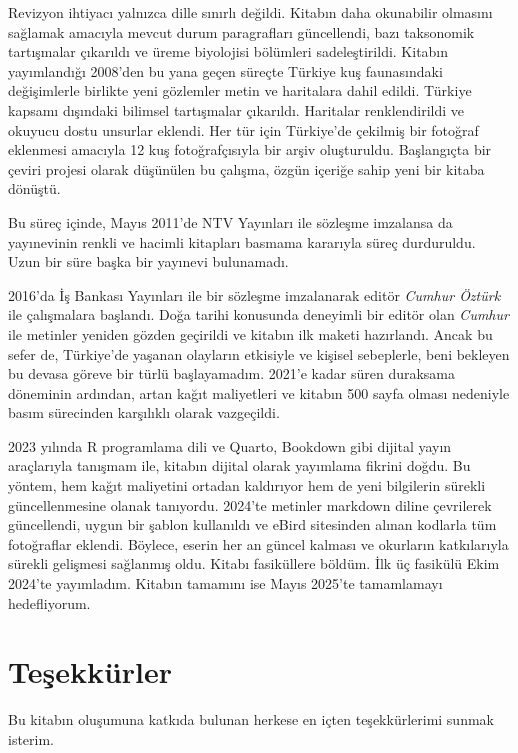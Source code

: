 \documentclass[
  a4paper,
  DIV=11,
  numbers=noendperiod]{scrreprt}
\begin{document}
Revizyon ihtiyacı yalnızca dille sınırlı değildi. Kitabın daha
okunabilir olmasını sağlamak amacıyla mevcut durum paragrafları
güncellendi, bazı taksonomik tartışmalar çıkarıldı ve üreme biyolojisi
bölümleri sadeleştirildi. Kitabın yayımlandığı 2008'den bu yana geçen
süreçte Türkiye kuş faunasındaki değişimlerle birlikte yeni gözlemler
metin ve haritalara dahil edildi. Türkiye kapsamı dışındaki bilimsel
tartışmalar çıkarıldı. Haritalar renklendirildi ve okuyucu dostu
unsurlar eklendi. Her tür için Türkiye'de çekilmiş bir fotoğraf
eklenmesi amacıyla 12 kuş fotoğrafçısıyla bir arşiv oluşturuldu.
Başlangıçta bir çeviri projesi olarak düşünülen bu çalışma, özgün
içeriğe sahip yeni bir kitaba dönüştü.

Bu süreç içinde, Mayıs 2011'de NTV Yayınları ile sözleşme imzalansa da
yayınevinin renkli ve hacimli kitapları basmama kararıyla süreç
durduruldu. Uzun bir süre başka bir yayınevi bulunamadı.

2016'da İş Bankası Yayınları ile bir sözleşme imzalanarak editör
\emph{Cumhur Öztürk} ile çalışmalara başlandı. Doğa tarihi konusunda
deneyimli bir editör olan \emph{Cumhur} ile metinler yeniden gözden
geçirildi ve kitabın ilk maketi hazırlandı. Ancak bu sefer de,
Türkiye'de yaşanan olayların etkisiyle ve kişisel sebeplerle, beni
bekleyen bu devasa göreve bir türlü başlayamadım. 2021'e kadar süren
duraksama döneminin ardından, artan kağıt maliyetleri ve kitabın 500
sayfa olması nedeniyle basım sürecinden karşılıklı olarak vazgeçildi.

2023 yılında R programlama dili ve Quarto, Bookdown gibi dijital yayın
araçlarıyla tanışmam ile, kitabın dijital olarak yayımlama fikrini
doğdu. Bu yöntem, hem kağıt maliyetini ortadan kaldırıyor hem de yeni
bilgilerin sürekli güncellenmesine olanak tanıyordu. 2024'te metinler
markdown diline çevrilerek güncellendi, uygun bir şablon kullanıldı ve
eBird sitesinden alınan kodlarla tüm fotoğraflar eklendi. Böylece,
eserin her an güncel kalması ve okurların katkılarıyla sürekli gelişmesi
sağlanmış oldu. Kitabı fasiküllere böldüm. İlk üç fasikülü Ekim 2024'te
yayımladım. Kitabın tamamını ise Mayıs 2025'te tamamlamayı hedefliyorum.

\section*{Teşekkürler}\label{teux15fekkuxfcrler}


Bu kitabın oluşumuna katkıda bulunan herkese en içten teşekkürlerimi
sunmak isterim.
\end{document}
